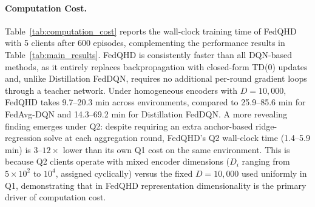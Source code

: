 \documentclass[sigconf,anonymous]{aamas}
\theoremstyle{plain}
\theoremstyle{definition}
\theoremstyle{remark}
\begin{document}
\paragraph{Computation Cost.} Table~\ref{tab:computation_cost} reports the wall-clock training time of FedQHD with 5 clients after 600 episodes, complementing the performance results in Table~\ref{tab:main_results}.  FedQHD is consistently faster than all DQN-based methods, as it entirely replaces backpropagation with closed-form TD(0) updates and, unlike Distillation FedDQN, requires no additional per-round gradient loops through a teacher network.
%
Under homogeneous encoders with $D=10{,}000$, FedQHD takes 9.7--20.3 min across environments, compared to 25.9--85.6 min for FedAvg-DQN and 14.3--69.2 min for Distillation FedDQN. A more revealing finding emerges under Q2: despite requiring an extra anchor-based ridge-regression solve at each aggregation round, FedQHD's Q2 wall-clock time (1.4--5.9 min) is $3$--$12\times$ lower than its own Q1 cost on the same environment. This is because Q2 clients operate with mixed encoder dimensions ($D_i$ ranging from $5\times10^2$ to $10^4$, assigned cyclically) versus the fixed $D=10{,}000$ used uniformly in Q1,  demonstrating that in FedQHD representation dimensionality is the primary driver of computation cost.
\end{document}
